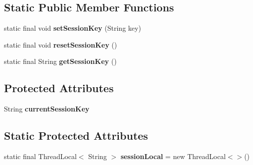 \subsection*{Static Public Member Functions}
\begin{DoxyCompactItemize}
\item 
\mbox{\label{classcom_1_1mysql_1_1cj_1_1jdbc_1_1interceptors_1_1_session_association_interceptor_a5a4578dc1324a1dc1a010deb257e7311}} 
static final void {\bfseries set\+Session\+Key} (String key)
\item 
\mbox{\label{classcom_1_1mysql_1_1cj_1_1jdbc_1_1interceptors_1_1_session_association_interceptor_ae4221ef68dac0b6de35cf46023db0c72}} 
static final void {\bfseries reset\+Session\+Key} ()
\item 
\mbox{\label{classcom_1_1mysql_1_1cj_1_1jdbc_1_1interceptors_1_1_session_association_interceptor_adbf840ce7adf4bbc54efc2fa4d6a9987}} 
static final String {\bfseries get\+Session\+Key} ()
\end{DoxyCompactItemize}
\subsection*{Protected Attributes}
\begin{DoxyCompactItemize}
\item 
\mbox{\label{classcom_1_1mysql_1_1cj_1_1jdbc_1_1interceptors_1_1_session_association_interceptor_a804bc59a162ecabfc4a6205e5da27955}} 
String {\bfseries current\+Session\+Key}
\end{DoxyCompactItemize}
\subsection*{Static Protected Attributes}
\begin{DoxyCompactItemize}
\item 
\mbox{\label{classcom_1_1mysql_1_1cj_1_1jdbc_1_1interceptors_1_1_session_association_interceptor_a13d158ba1aa03473494a82edfd567ff5}} 
static final Thread\+Local$<$ String $>$ {\bfseries session\+Local} = new Thread\+Local$<$$>$()
\end{DoxyCompactItemize}


